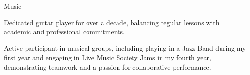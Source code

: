 

\begin{cventries}
  \cventry
    {} %
    {Music} %
    {} %
    {} %
    {
      \begin{cvitems} %
        \item {Dedicated guitar player for over a decade, balancing regular lessons with academic and professional commitments.}
        \item {Active participant in musical groups, including playing in a Jazz Band during my first year and engaging in Live Music Society Jams in my fourth year, demonstrating teamwork and a passion for collaborative performance.}
      \end{cvitems}
    }


\end{cventries}




